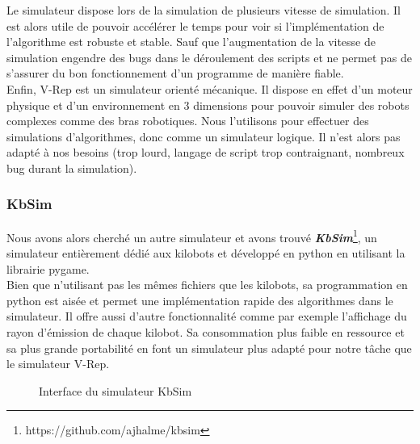 \documentclass[a4paper,8pt]{report}
\begin{document}
\medskip
Le simulateur dispose lors de la simulation de plusieurs vitesse de simulation. Il est alors utile de pouvoir acc\'el\'erer le temps pour voir si l'impl\'ementation de l'algorithme est robuste et stable. Sauf que l'augmentation de la vitesse de simulation engendre des bugs dans le d\'eroulement des scripts et ne permet pas de s'assurer du bon fonctionnement d'un programme de mani\`ere fiable.\\

\medskip
Enfin, V-Rep est un simulateur orient\'e m\'ecanique. Il dispose en effet d'un moteur physique et d'un environnement en 3 dimensions pour pouvoir simuler des robots complexes comme des bras robotiques. Nous l'utilisons pour effectuer des simulations d'algorithmes, donc comme un simulateur logique. Il n'est alors pas adapt\'e \`a nos besoins (trop lourd, langage de script trop contraignant, nombreux bug durant la simulation).\\

\subsubsection*{KbSim}\label{subsubsec:name}

\medskip
Nous avons alors cherché un autre simulateur et avons trouvé \textit{\textbf{KbSim}}\footnote{https://github.com/ajhalme/kbsim}, un simulateur entièrement dédié aux kilobots et développé en python en utilisant la librairie pygame.\\
Bien que n'utilisant pas les mêmes fichiers que les kilobots, sa programmation en python est aisée et permet une implémentation rapide des algorithmes dans le simulateur. Il offre aussi d'autre fonctionnalité comme par exemple l'affichage du rayon d'émission de chaque kilobot. Sa consommation plus faible en ressource et sa plus grande portabilité en font un simulateur plus adapté pour notre tâche que le simulateur V-Rep.\\

\begin{figure}[!h]
    \centering
    \caption{Interface du simulateur KbSim}
\end{figure}
\end{document}
